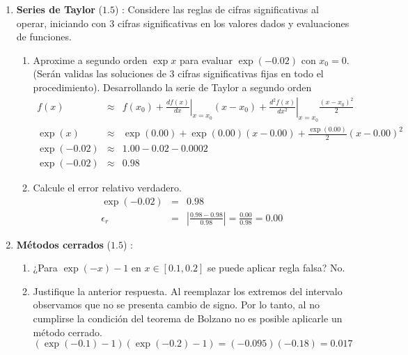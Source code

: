 \documentclass[12pt]{article}
\begin{document}
  \begin{enumerate}[leftmargin=*,widest=9]
    \item \textbf{Series de Taylor} ($1.5$) : Considere las reglas de cifras significativas al operar, iniciando con 3 cifras significativas en los valores dados y evaluaciones de funciones.
    \begin{enumerate}[label=\alph*]
    \item Aproxime a segundo orden $\exp x$ para evaluar $\exp (-0.02)$ con $x_0 = 0$. (Serán validas las soluciones de 3 cifras significativas fijas en todo el procedimiento).
    Desarrollando la serie de Taylor a segundo orden
    \begin{eqnarray*}
    f(x) & \approx & f(x_0) + \left.\frac{df(x)}{dx}\right|_{x=x_0}(x-x_0)+ \left.\frac{d^2f(x)}{dx^2}\right|_{x=x_0}\frac{(x-x_0)^2}{2}\\
    \exp(x) & \approx & \exp(0.00) + \exp(0.00)(x-0.00) + \frac{\exp(0.00)}{2}(x-0.00)^2 \\
    \exp(-0.02) & \approx & 1.00 - 0.02 - 0.0002\\
    \exp(-0.02) & \approx & 0.98
    \end{eqnarray*}
   \item Calcule el error relativo verdadero.
    \begin{eqnarray*}
    \exp(-0.02) & = & 0.98\\
    \epsilon_r & = & \left| \frac{0.98 - 0.98}{0.98} \right| = \frac{0.00}{0.98} = 0.00
    \end{eqnarray*}
    \end{enumerate}
    \item \textbf{Métodos cerrados} ($1.5$) :
    \begin{enumerate}[label=\alph*]
    \item ¿Para $\exp (-x) - 1$ en $x \in \left[ 0.1, 0.2 \right]$ se puede aplicar regla falsa?
    No.
    \item Justifique la anterior respuesta.
   Al reemplazar los extremos del intervalo observamos que no se presenta cambio de signo. Por lo tanto, al no cumplirse la condición del teorema de Bolzano no es posible aplicarle un método cerrado.
   \[ (\exp(-0.1)-1)(\exp(-0.2)-1) = (-0.095)(-0.18) = 0.017 \]
    \end{enumerate}

\end{enumerate}
\end{document}
